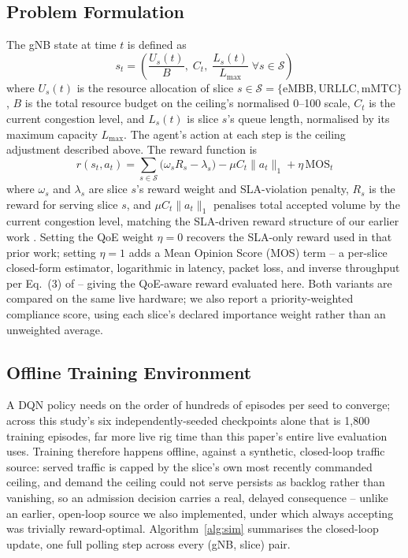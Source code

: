 \documentclass[conference]{IEEEtran}
\begin{document}
\subsection{Problem Formulation}
The gNB state at time $t$ is defined as
\begin{equation}
s_t = \left(\frac{U_s(t)}{B}, \; C_t, \; \frac{L_s(t)}{L_{\max}} \;\forall s \in \mathcal{S}\right)
\label{eq:state}
\end{equation}
where $U_s(t)$ is the resource allocation of slice $s \in
\mathcal{S}=\{\text{eMBB},\text{URLLC},\text{mMTC}\}$, $B$ is the
total resource budget on the ceiling's normalised 0--100 scale, $C_t$
is the current congestion level, and
$L_s(t)$ is slice $s$'s queue length, normalised by its maximum
capacity $L_{\max}$. The agent's action at each step is the ceiling
adjustment described above. The reward function is
\begin{equation}
r(s_t,a_t) = \sum_{s\in\mathcal{S}}\big(\omega_s R_s - \lambda_s\big) - \mu C_t\|a_t\|_1 + \eta\,\mathrm{MOS}_t
\label{eq:reward}
\end{equation}
where $\omega_s$ and $\lambda_s$ are slice $s$'s reward weight and
SLA-violation penalty, $R_s$ is the reward for serving slice $s$, and
$\mu C_t\|a_t\|_1$ penalises total accepted volume by the current
congestion level, matching the SLA-driven reward structure of our
earlier work \cite{mecon-paper1,icraie-paper2}. Setting the QoE
weight $\eta=0$ recovers the SLA-only reward used in that prior work;
setting $\eta=1$ adds a Mean Opinion Score (MOS) term -- a per-slice
closed-form estimator, logarithmic in latency, packet loss, and
inverse throughput per Eq.~(3) of \cite{survey-paper3} -- giving the
QoE-aware reward evaluated here. Both variants are compared on the
same live hardware; we also report a priority-weighted compliance
score, using each slice's declared importance weight rather than an
unweighted average.

\subsection{Offline Training Environment}
\label{sec:offline-env}
A DQN policy needs on the order of hundreds of episodes per seed to
converge; across this study's six independently-seeded checkpoints
alone that is 1,800 training episodes, far more live rig time than
this paper's entire live evaluation uses. Training therefore happens
offline, against a synthetic, closed-loop traffic source: served
traffic is capped by the slice's own most recently commanded ceiling,
and demand the ceiling could not serve persists as backlog rather
than vanishing, so an admission decision carries a real, delayed
consequence -- unlike an earlier, open-loop source we also
implemented, under which always accepting was trivially
reward-optimal. Algorithm~\ref{alg:sim} summarises the closed-loop
update, one full polling step across every (gNB, slice) pair.
\end{document}
